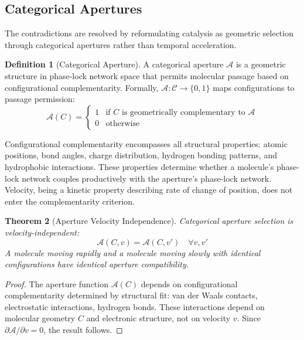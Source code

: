 \documentclass[twocolumn,10pt,a4paper]{article}
\newtheorem{theorem}{Theorem}[section]
\theoremstyle{definition}
\newtheorem{definition}[theorem]{Definition}
\theoremstyle{remark}
\newcommand{\catspace}{\mathcal{C}}
\newcommand{\aperture}{\mathcal{A}}
\begin{document}
\subsection{Categorical Apertures}

The contradictions are resolved by reformulating catalysis as geometric selection through categorical apertures rather than temporal acceleration.

\begin{definition}[Categorical Aperture]
\label{def:aperture}
A categorical aperture $\aperture$ is a geometric structure in phase-lock network space that permits molecular passage based on configurational complementarity. Formally, $\aperture: \catspace \to \{0, 1\}$ maps configurations to passage permission:
\begin{equation}
\aperture(C) = \begin{cases}
1 & \text{if } C \text{ is geometrically complementary to } \aperture \\
0 & \text{otherwise}
\end{cases}
\end{equation}
\end{definition}

Configurational complementarity encompasses all structural properties: atomic positions, bond angles, charge distribution, hydrogen bonding patterns, and hydrophobic interactions. These properties determine whether a molecule's phase-lock network couples productively with the aperture's phase-lock network. Velocity, being a kinetic property describing rate of change of position, does not enter the complementarity criterion.

\begin{theorem}[Aperture Velocity Independence]
\label{thm:aperture_velocity}
Categorical aperture selection is velocity-independent:
\begin{equation}
\aperture(C, v) = \aperture(C, v') \quad \forall v, v'
\end{equation}
A molecule moving rapidly and a molecule moving slowly with identical configurations have identical aperture compatibility.
\end{theorem}

\begin{proof}
The aperture function $\aperture(C)$ depends on configurational complementarity determined by structural fit: van der Waals contacts, electrostatic interactions, hydrogen bonds. These interactions depend on molecular geometry $C$ and electronic structure, not on velocity $v$. Since $\partial \aperture/\partial v = 0$, the result follows.
\end{proof}
\end{document}
